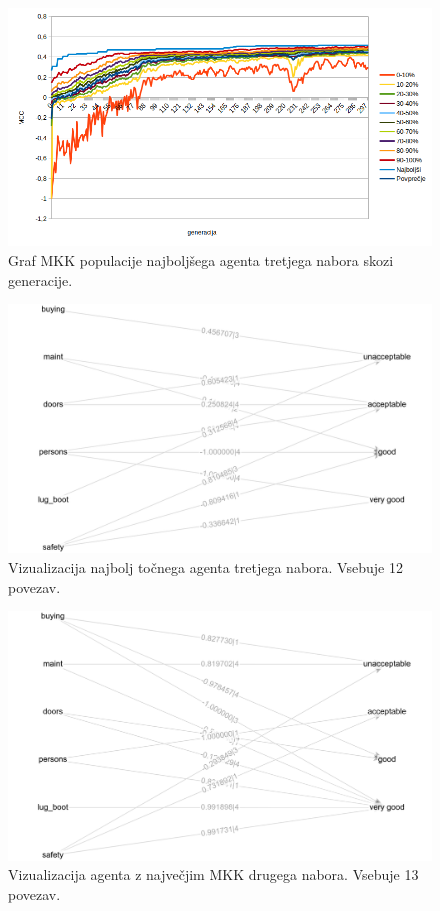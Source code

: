 \begin{figure}[H]
    \begin{center}
        \includegraphics[width=13cm]{car/3/mcc}
    \end{center}
    \caption{Graf MKK populacije najboljšega agenta tretjega nabora skozi generacije.}
    \label{fig:car_mcc_3}
\end{figure}

\begin{figure}[H]
    \begin{center}
        \includegraphics[width=13cm]{car/3/acc_g}
    \end{center}
    \caption{Vizualizacija najbolj točnega agenta tretjega nabora. Vsebuje 12 povezav.}
    \label{fig:car_acc_3_g}
\end{figure}

\begin{figure}[H]
    \begin{center}
        \includegraphics[width=13cm]{car/3/mcc_g}
    \end{center}
    \caption{Vizualizacija agenta z največjim MKK drugega nabora. Vsebuje 13 povezav.}
    \label{fig:car_mcc_3_g}
\end{figure}